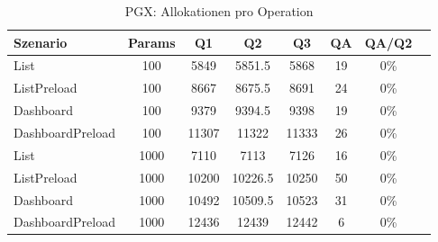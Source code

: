 \begin{table}[ht]
\centering
\caption{PGX: Allokationen pro Operation}
\begin{tabular}{lccccccc}
\toprule
Szenario & Params & Q1 & Q2 & Q3 & QA & QA/Q2 \\
\midrule
	List & 100 & 5849 & 5851.5 & 5868 & 19 & 0\% \\
	ListPreload & 100 & 8667 & 8675.5 & 8691 & 24 & 0\% \\
	Dashboard & 100 & 9379 & 9394.5 & 9398 & 19 & 0\% \\
	DashboardPreload & 100 & 11307 & 11322 & 11333 & 26 & 0\% \\
	List & 1000 & 7110 & 7113 & 7126 & 16 & 0\% \\
	ListPreload & 1000 & 10200 & 10226.5 & 10250 & 50 & 0\% \\
	Dashboard & 1000 & 10492 & 10509.5 & 10523 & 31 & 0\% \\
	DashboardPreload & 1000 & 12436 & 12439 & 12442 & 6 & 0\% \\
\bottomrule
\end{tabular}
\label{tab:benchmark_pgx_allocsperop}
\end{table}
	